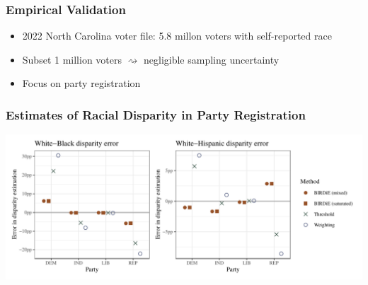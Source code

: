 \documentclass{beamer}
\begin{document}
\begin{frame}

  \frametitle{Empirical Validation}

  \begin{itemize}
  \item 2022 North Carolina voter file: 5.8 millon voters with
    self-reported race
  \item Subset 1 million voters $\rightsquigarrow$ negligible sampling
    uncertainty

    \vfill
  \item Focus on party registration

  \end{itemize}

\end{frame}

\begin{frame}

  \frametitle{Estimates of Racial Disparity in Party Registration}

  \includegraphics[width=\textwidth]{../paper/figures/nc_disp.pdf}


\end{frame}
\end{document}
